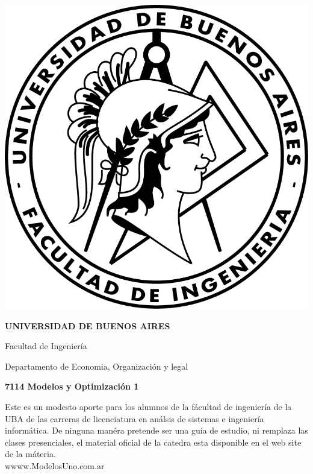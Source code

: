\documentclass[12pt]{book}
\begin{document}
\thispagestyle{empty}

\begin {center}

\includegraphics[scale=.4]{./img/Logo-fiuba_big.png}


\medskip
\textbf{\large UNIVERSIDAD DE BUENOS AIRES}

Facultad de Ingenier\'ia

Departamento de Economia, Organizaci\'on y legal


\vspace{3cm}



\textbf{\large 7114 Modelos y Optimizaci\'on 1}

\vspace{2cm}


Este es un modesto aporte para los alumnos de la f\'acultad de ingenier\'ia  de la UBA de las carreras de licenciatura en an\'alsis de sistemas e ingenier\'ia inform\'atica.
De ninguna man\'era pretende ser una gu\'ia de estudio, ni remplaza las clases presenciales, el material oficial de la catedra esta disponible en el web site de la m\'ateria.
\\
wwww.ModelosUno.com.ar

\end {center}


\vspace{2.5cm}
\end{document}
